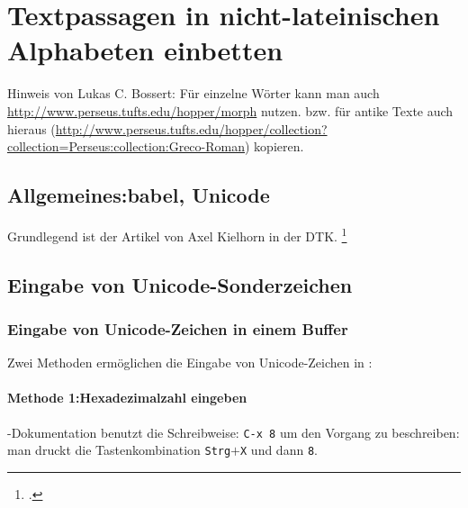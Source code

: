 \chapter{Textpassagen in nicht-lateinischen Alphabeten einbetten}

Hinweis von Lukas C. Bossert:
Für einzelne Wörter kann man auch \url{http://www.perseus.tufts.edu/hopper/morph} nutzen.
bzw. für antike Texte auch hieraus (\url{http://www.perseus.tufts.edu/hopper/collection?collection=Perseus:collection:Greco-Roman}) kopieren.

\section{Allgemeines:\enspace babel, Unicode}

Grundlegend ist der Artikel von Axel Kielhorn in der DTK.%
\footcite{kielhorn:dtk2014}

\section{Eingabe von Unicode-Sonderzeichen}
\label{unicodeeingabe}

\subsection{Eingabe von Unicode-Zeichen in
einem  Buffer}
\label{unicodeviaemacs}

Zwei Methoden ermöglichen die Eingabe von
Unicode-Zeichen in :

\subsubsection*{Methode 1:\enspace Hexadezimalzahl eingeben}
-Dokumentation benutzt die Schreibweise: %
\texttt{C-x 8}
um den Vorgang zu beschreiben: man druckt die Tastenkombination
\texttt{Strg}$+$\texttt{X} und dann \texttt{8}.

